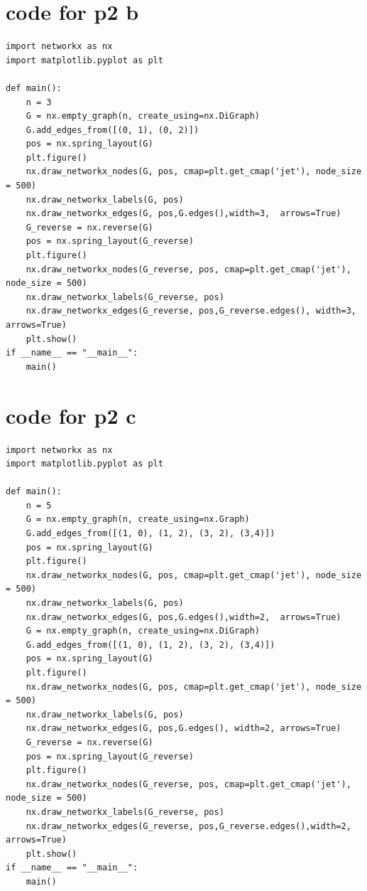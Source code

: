 \documentclass{article}
\begin{document}
\section*{code for p2 b}
\begin{verbatim}
import networkx as nx
import matplotlib.pyplot as plt

def main():
    n = 3
    G = nx.empty_graph(n, create_using=nx.DiGraph)
    G.add_edges_from([(0, 1), (0, 2)])
    pos = nx.spring_layout(G)
    plt.figure()
    nx.draw_networkx_nodes(G, pos, cmap=plt.get_cmap('jet'), node_size = 500)
    nx.draw_networkx_labels(G, pos)
    nx.draw_networkx_edges(G, pos,G.edges(),width=3,  arrows=True)
    G_reverse = nx.reverse(G)
    pos = nx.spring_layout(G_reverse)
    plt.figure()
    nx.draw_networkx_nodes(G_reverse, pos, cmap=plt.get_cmap('jet'), node_size = 500)
    nx.draw_networkx_labels(G_reverse, pos)
    nx.draw_networkx_edges(G_reverse, pos,G_reverse.edges(), width=3, arrows=True)
    plt.show()
if __name__ == "__main__":
    main()
\end{verbatim}
\section*{code for p2 c}
\begin{verbatim}
import networkx as nx
import matplotlib.pyplot as plt

def main():
    n = 5
    G = nx.empty_graph(n, create_using=nx.Graph)
    G.add_edges_from([(1, 0), (1, 2), (3, 2), (3,4)])
    pos = nx.spring_layout(G)
    plt.figure()
    nx.draw_networkx_nodes(G, pos, cmap=plt.get_cmap('jet'), node_size = 500)
    nx.draw_networkx_labels(G, pos)
    nx.draw_networkx_edges(G, pos,G.edges(),width=2,  arrows=True)
    G = nx.empty_graph(n, create_using=nx.DiGraph)
    G.add_edges_from([(1, 0), (1, 2), (3, 2), (3,4)])
    pos = nx.spring_layout(G)
    plt.figure()
    nx.draw_networkx_nodes(G, pos, cmap=plt.get_cmap('jet'), node_size = 500)
    nx.draw_networkx_labels(G, pos)
    nx.draw_networkx_edges(G, pos,G.edges(), width=2, arrows=True)
    G_reverse = nx.reverse(G)
    pos = nx.spring_layout(G_reverse)
    plt.figure()
    nx.draw_networkx_nodes(G_reverse, pos, cmap=plt.get_cmap('jet'), node_size = 500)
    nx.draw_networkx_labels(G_reverse, pos)
    nx.draw_networkx_edges(G_reverse, pos,G_reverse.edges(),width=2,  arrows=True)
    plt.show()
if __name__ == "__main__":
    main()
\end{verbatim}
\end{document}
